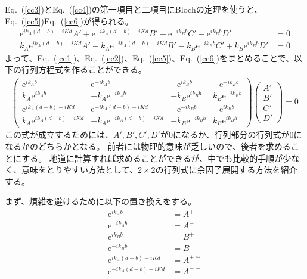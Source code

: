 \documentclass[autodetect-engine,dvipdfmx-if-dvi,ja=standard,a4paper,layout=v2]{bxjsreport}
\newcommand{\eref}[1]{Eq.~(\ref{#1})}
\begin{document}
    \eref{cc3}と\eref{cc4}の第一項目と二項目にBlochの定理を使うと、\eref{cc5}\eref{cc6}が得られる。
    \begin{align}
    \mathrm{e}^{ik_A(d-b)-iKd}A'+\mathrm{e}^{-ik_A(d-b)-iKd}B'-\mathrm{e}^{-ik_Bb}C'-\mathrm{e}^{ik_Bb}D'&=0\label{cc5}\\
    k_A\mathrm{e}^{ik_A(d-b)-iKd}A'-k_A\mathrm{e}^{-ik_A(d-b)-iKd}B'-k_B\mathrm{e}^{-ik_Bb}C'+k_B\mathrm{e}^{ik_Bb}D'&=0\label{cc6}
    \end{align}
    よって、\eref{cc1}、\eref{cc2}、\eref{cc5}、\eref{cc6}をまとめることで、以下の行列方程式を作ることができる。
    \begin{align}
    \begin{pmatrix}
    \mathrm{e}^{ik_Ab}&\mathrm{e}^{-ik_Ab}&-\mathrm{e}^{ik_Bb}&-\mathrm{e}^{-ik_Bb}\\
    k_A\mathrm{e}^{ik_Ab}&-k_A\mathrm{e}^{-ik_Ab}&-k_B\mathrm{e}^{ik_Bb}&k_B\mathrm{e}^{-ik_Bb}\\
    \mathrm{e}^{ik_A(d-b)-iKd}&\mathrm{e}^{-ik_A(d-b)-iKd}&-\mathrm{e}^{-ik_Bb}&-\mathrm{e}^{ik_Bb}\\
    k_A\mathrm{e}^{ik_A(d-b)-iKd}&-k_A\mathrm{e}^{-ik_A(d-b)-iKd}&-k_B\mathrm{e}^{-ik_Bb}&k_B\mathrm{e}^{ik_Bb}
    \end{pmatrix}
    \begin{pmatrix}
    A'\\
    B'\\
    C'\\
    D'
    \end{pmatrix}=0
    \end{align}
    この式が成立するためには、$A',B',C',D'$が0になるか、行列部分の行列式が0になるかのどちらかとなる。
    前者には物理的意味が乏しいので、後者を求めることにする。
    地道に計算すれば求めることができるが、中でも比較的手順が少なく、意味をとりやすい方法として、$2\times2$の行列式に余因子展開する方法を紹介する。\par
    まず、煩雑を避けるために以下の置き換えをする。
    \begin{align}
    \mathrm{e}^{ik_Ab}&=A^+\nonumber\\
    \mathrm{e}^{-ik_Ab}&=A^-\nonumber\\
    \mathrm{e}^{ik_Bb}&=B^+\nonumber\\
    \mathrm{e}^{-ik_Bb}&=B^-\nonumber\\
    \mathrm{e}^{ik_A(d-b)-iKd}&=A^{+\sim}\nonumber\\
    \mathrm{e}^{-ik_A(d-b)-iKd}&=A^{-\sim}\nonumber
    \end{align}
\end{document}
